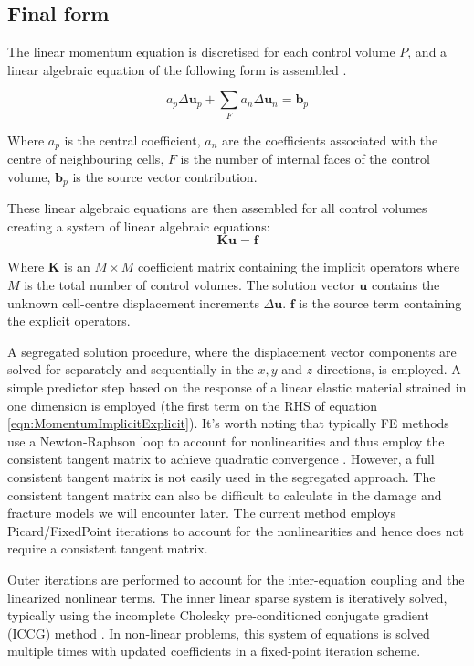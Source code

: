 \documentclass[sn-mathphys,Numbered,draft]{sn-jnl}%
\begin{document}
\subsection{Final form}

The linear momentum equation is discretised for each control volume $P$, and a linear algebraic equation of the following form is assembled \cite{jasak_application_2000}.

\begin{equation}
a_p \Delta \mathbf{u}_p+\sum_F a_n \Delta \mathbf{u}_n=\mathbf{b}_p
\end{equation}

Where $a_{p}$ is the central coefficient, $a_{n}$ are the coefficients associated with the centre of neighbouring cells, $F$ is the number of internal faces of the control volume,  $\mathbf{b}_p$ is the source vector contribution.

These linear algebraic equations are then assembled for all control volumes creating a system of linear algebraic equations:
\begin{equation}
    \mathbf{K}\mathbf{u}=\mathbf{f}
\end{equation}

Where $\mathbf{K}$ is an $M \times M$ coefficient matrix containing the implicit operators where $M$ is the total number of control volumes. The solution vector $\mathbf{u}$ contains the unknown cell-centre displacement increments $\Delta\mathbf{ u}$. $\mathbf{f}$ is the source term containing the explicit operators. 

A segregated solution procedure, where the displacement vector components are solved for separately and sequentially in the $x, y$ and $z$ directions, is employed. A simple predictor step based on the response of a linear elastic material strained in one dimension is employed (the first term on the RHS of equation \ref{eqn:MomentumImplicitExplicit}). It's worth noting that typically FE methods use a Newton-Raphson loop to account for  nonlinearities and thus employ the consistent tangent matrix to achieve quadratic convergence \cite{bathe_finite_1996}. However, a full consistent tangent matrix is not easily used in the segregated approach. The consistent tangent matrix can also be difficult to calculate in the damage and fracture models we will encounter later. The current method employs Picard/FixedPoint iterations to account for the nonlinearities and hence does not require a consistent tangent matrix.

Outer iterations are performed to account for the inter-equation coupling and the linearized nonlinear terms. The inner linear sparse system is iteratively solved, typically using the incomplete Cholesky pre-conditioned conjugate gradient (ICCG) method \cite{jacobs_generalization_1986}. In non-linear problems, this system of equations is solved multiple times with updated coefficients in a fixed-point iteration scheme. 
\end{document}
